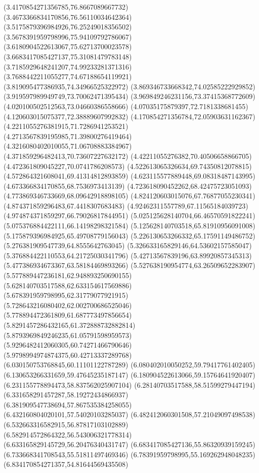 {(3.4170854271356785,76.8667089667732)
(3.4673366834170856,76.56110034642364)
(3.5175879396984926,76.25249018356502)
(3.5678391959798996,75.94109792786067)
(3.6180904522613067,75.62713700023578)
(3.6683417085427137,75.31081479783148)
(3.7185929648241207,74.99233281371316)
(3.7688442211055277,74.67188654119921)
(3.819095477386935,74.34966525322972)
(3.869346733668342,74.02585222929852)
(3.919597989949749,73.70062471395434)
(3.969849246231156,73.37415368772609)
(4.020100502512563,73.04660386558666)
(4.07035175879397,72.7181338681455)
(4.120603015075377,72.38889607992832)
(4.170854271356784,72.05903631162367)
(4.2211055276381915,71.7286941253521)
(4.2713567839195985,71.39800276419464)
(4.3216080402010055,71.06708883384967)
(4.371859296482413,70.73607227632172)
(4.42211055276382,70.40506658866705)
(4.472361809045227,70.0741786208573)
(4.522613065326634,69.74350812078815)
(4.572864321608041,69.41314812893859)
(4.623115577889448,69.08318487143995)
(4.673366834170855,68.7536973413139)
(4.723618090452262,68.42475723051093)
(4.773869346733669,68.09642918898105)
(4.824120603015076,67.76877055230341)
(4.874371859296483,67.4418307683483)
(4.92462311557789,67.11565184039723)
(4.974874371859297,66.79026817844951)
(5.025125628140704,66.46570591822241)
(5.075376884422111,66.14198298321584)
(5.125628140703518,65.81910956091008)
(5.175879396984925,65.49708779156043)
(5.226130653266332,65.17591149486752)
(5.276381909547739,64.8555642763045)
(5.326633165829146,64.53602157585047)
(5.376884422110553,64.21725030341796)
(5.42713567839196,63.89920857345313)
(5.477386934673367,63.58184469893266)
(5.527638190954774,63.26509652283907)
(5.577889447236181,62.948893250690155)
(5.628140703517588,62.633154617569886)
(5.678391959798995,62.31779077921915)
(5.728643216080402,62.002700686525046)
(5.778894472361809,61.687773497856654)
(5.8291457286432165,61.372888732882814)
(5.8793969849246235,61.05791598959573)
(5.9296482412060305,60.74271466790646)
(5.9798994974874375,60.42713337289768)
(6.030150753768845,60.11101122787289)
(6.080402010050252,59.79417761402405)
(6.130653266331659,59.47645235187147)
(6.180904522613066,59.15764641920407)
(6.231155778894473,58.837562025907104)
(6.28140703517588,58.51599279447194)
(6.331658291457287,58.19272434866937)
(6.381909547738694,57.867535384258055)
(6.432160804020101,57.54020103285037)
(6.482412060301508,57.21049097498538)
(6.532663316582915,56.87817103102889)
(6.582914572864322,56.543006321778314)
(6.633165829145729,56.20476340431747)
(6.683417085427136,55.86320939159245)
(6.733668341708543,55.51811497469346)
(6.78391959798995,55.169262948048235)
(6.834170854271357,54.81644569435508)
}
